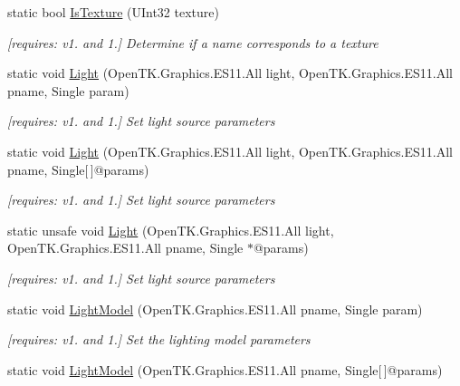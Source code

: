 \begin{DoxyCompactItemize}
static bool \hyperlink{class_open_t_k_1_1_graphics_1_1_e_s11_1_1_g_l_afa01b2eb6b37c6cd237b4d8b1ab272ce}{Is\-Texture} (U\-Int32 texture)
\begin{DoxyCompactList}\small\item\em \mbox{[}requires\-: v1. and 1.\mbox{]} Determine if a name corresponds to a texture \end{DoxyCompactList}\item 
static void \hyperlink{class_open_t_k_1_1_graphics_1_1_e_s11_1_1_g_l_ada78b787ab59d49d606a3ea8041e31ba}{Light} (Open\-T\-K.\-Graphics.\-E\-S11.\-All light, Open\-T\-K.\-Graphics.\-E\-S11.\-All pname, Single param)
\begin{DoxyCompactList}\small\item\em \mbox{[}requires\-: v1. and 1.\mbox{]} Set light source parameters \end{DoxyCompactList}\item 
static void \hyperlink{class_open_t_k_1_1_graphics_1_1_e_s11_1_1_g_l_a8048d896e091690419c10999e8b51dd7}{Light} (Open\-T\-K.\-Graphics.\-E\-S11.\-All light, Open\-T\-K.\-Graphics.\-E\-S11.\-All pname, Single\mbox{[}$\,$\mbox{]}@params)
\begin{DoxyCompactList}\small\item\em \mbox{[}requires\-: v1. and 1.\mbox{]} Set light source parameters \end{DoxyCompactList}\item 
static unsafe void \hyperlink{class_open_t_k_1_1_graphics_1_1_e_s11_1_1_g_l_aa28c0a717aa4e61cb16ebe02cf365bbf}{Light} (Open\-T\-K.\-Graphics.\-E\-S11.\-All light, Open\-T\-K.\-Graphics.\-E\-S11.\-All pname, Single $\ast$@params)
\begin{DoxyCompactList}\small\item\em \mbox{[}requires\-: v1. and 1.\mbox{]} Set light source parameters \end{DoxyCompactList}\item 
static void \hyperlink{class_open_t_k_1_1_graphics_1_1_e_s11_1_1_g_l_a42c5311cdf66139eab0f17ba67162fec}{Light\-Model} (Open\-T\-K.\-Graphics.\-E\-S11.\-All pname, Single param)
\begin{DoxyCompactList}\small\item\em \mbox{[}requires\-: v1. and 1.\mbox{]} Set the lighting model parameters \end{DoxyCompactList}\item 
static void \hyperlink{class_open_t_k_1_1_graphics_1_1_e_s11_1_1_g_l_a74e2c587d9e6bf4696dbc108b5d549ef}{Light\-Model} (Open\-T\-K.\-Graphics.\-E\-S11.\-All pname, Single\mbox{[}$\,$\mbox{]}@params)

\end{DoxyCompactItemize}
